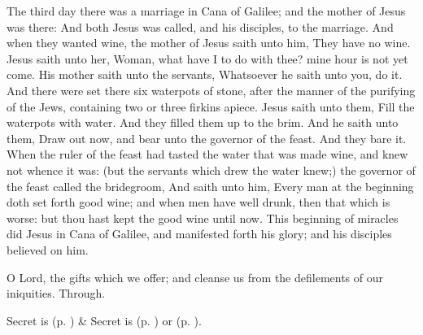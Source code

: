  The third day there was a marriage in Cana of Galilee; and the mother of Jesus was there: And both Jesus was called, and his disciples, to the marriage. And when they wanted wine, the mother of Jesus saith unto him, They have no wine. Jesus saith unto her, Woman, what have I to do with thee? mine hour is not yet come. His mother saith unto the servants, Whatsoever he saith unto you, do it. And there were set there six waterpots of stone, after the manner of the purifying of the Jews, containing two or three firkins apiece. Jesus saith unto them, Fill the waterpots with water. And they filled them up to the brim. And he saith unto them, Draw out now, and bear unto the governor of the feast. And they bare it. When the ruler of the feast had tasted the water that was made wine, and knew not whence it was: (but the servants which drew the water knew;) the governor of the feast called the bridegroom, And saith unto him, Every man at the beginning doth set forth good wine; and when men have well drunk, then that which is worse: but thou hast kept the good wine until now. This beginning of miracles did Jesus in Cana of Galilee, and manifested forth his glory; and his disciples believed on him.


\vspace{-0.25\baselineskip}

\secret\label{EpiphanyIISecret}
 O Lord, the gifts which we offer; and cleanse us from the defilements of our iniquities. Through.


\begin{rubric}
     Secret is  (p. \pageref{SPMaryPostChristmas}) \&  Secret is  (p. \pageref{SPAgainst}) or  (p. \pageref{SPChiefBishop}).
\end{rubric}


